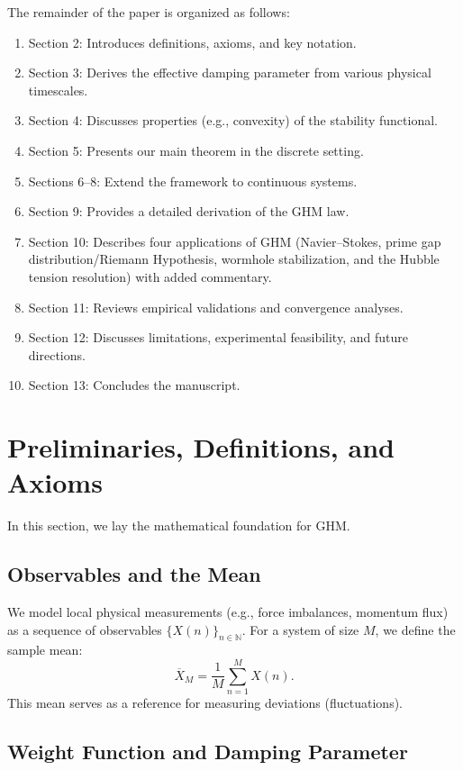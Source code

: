 \documentclass[11pt]{article}
\begin{document}
The remainder of the paper is organized as follows:
\begin{enumerate}
    \item Section 2: Introduces definitions, axioms, and key notation.
    \item Section 3: Derives the effective damping parameter from various physical timescales.
    \item Section 4: Discusses properties (e.g., convexity) of the stability functional.
    \item Section 5: Presents our main theorem in the discrete setting.
    \item Sections 6--8: Extend the framework to continuous systems.
    \item Section 9: Provides a detailed derivation of the GHM law.
    \item Section 10: Describes four applications of GHM (Navier--Stokes, prime gap distribution/Riemann Hypothesis, wormhole stabilization, and the Hubble tension resolution) with added commentary.
    \item Section 11: Reviews empirical validations and convergence analyses.
    \item Section 12: Discusses limitations, experimental feasibility, and future directions.
    \item Section 13: Concludes the manuscript.
\end{enumerate}

\section{Preliminaries, Definitions, and Axioms}

In this section, we lay the mathematical foundation for GHM.

\subsection{Observables and the Mean}

We model local physical measurements (e.g., force imbalances, momentum flux) as a sequence of observables $\{X(n)\}_{n \in \mathbb{N}}$. For a system of size $M$, we define the sample mean:
\[
\overline{X}_M = \frac{1}{M} \sum_{n=1}^{M} X(n).
\]
This mean serves as a reference for measuring deviations (fluctuations).

\subsection{Weight Function and Damping Parameter}
\end{document}
